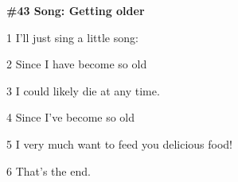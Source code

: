 
\textbf{\#43 Song: Getting older}

1 I'll just sing a little song:

2 Since I have become so old

3 I could likely die at any time.

4 Since I've become so old

5 I very much want to feed you delicious food!

6 That's the end.


